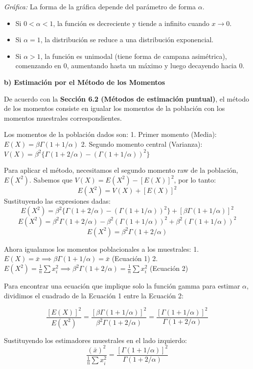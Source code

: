 \documentclass[12pt]{article}
\begin{document}
\textit{Gráfica:} La forma de la gráfica depende del parámetro de forma $\alpha$.
\begin{itemize}
    \item Si $0 < \alpha < 1$, la función es decreciente y tiende a infinito cuando $x \to 0$.
    \item Si $\alpha = 1$, la distribución se reduce a una distribución exponencial.
    \item Si $\alpha > 1$, la función es unimodal (tiene forma de campana asimétrica), comenzando en 0, aumentando hasta un máximo y luego decayendo hacia 0.
\end{itemize}

\textbf{b) Estimación por el Método de los Momentos}

De acuerdo con la \textbf{Sección 6.2 (Métodos de estimación puntual)}, el método de los momentos consiste en igualar los momentos de la población con los momentos muestrales correspondientes.

Los momentos de la población dados son:
1. Primer momento (Media): $E(X) = \beta\Gamma(1 + 1/\alpha)$
2. Segundo momento central (Varianza): $V(X) = \beta^2\{\Gamma(1 + 2/\alpha) - (\Gamma(1 + 1/\alpha))^2\}$

Para aplicar el método, necesitamos el segundo momento raw de la población, $E(X^2)$. Sabemos que $V(X) = E(X^2) - [E(X)]^2$, por lo tanto:
$$ E(X^2) = V(X) + [E(X)]^2 $$
Sustituyendo las expresiones dadas:
$$ E(X^2) = \beta^2\{\Gamma(1 + 2/\alpha) - (\Gamma(1 + 1/\alpha))^2\} + [\beta\Gamma(1 + 1/\alpha)]^2 $$
$$ E(X^2) = \beta^2\Gamma(1 + 2/\alpha) - \beta^2(\Gamma(1 + 1/\alpha))^2 + \beta^2(\Gamma(1 + 1/\alpha))^2 $$
$$ E(X^2) = \beta^2\Gamma(1 + 2/\alpha) $$

Ahora igualamos los momentos poblacionales a los muestrales:
1. $E(X) = \bar{x} \implies \beta\Gamma(1 + 1/\alpha) = \bar{x}$  (Ecuación 1)
2. $E(X^2) = \frac{1}{n}\sum x_i^2 \implies \beta^2\Gamma(1 + 2/\alpha) = \frac{1}{n}\sum x_i^2$ (Ecuación 2)

Para encontrar una ecuación que implique solo la función gamma para estimar $\alpha$, dividimos el cuadrado de la Ecuación 1 entre la Ecuación 2:

$$ \frac{[E(X)]^2}{E(X^2)} = \frac{[\beta\Gamma(1 + 1/\alpha)]^2}{\beta^2\Gamma(1 + 2/\alpha)} = \frac{[\Gamma(1 + 1/\alpha)]^2}{\Gamma(1 + 2/\alpha)} $$

Sustituyendo los estimadores muestrales en el lado izquierdo:
$$ \frac{(\bar{x})^2}{\frac{1}{n}\sum x_i^2} = \frac{[\Gamma(1 + 1/\alpha)]^2}{\Gamma(1 + 2/\alpha)} $$
\end{document}
